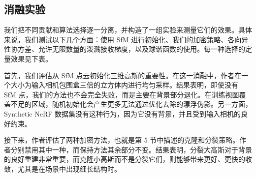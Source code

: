 \subsection{消融实验}

我们把不同贡献和算法选择逐一分离，并构造了一组实验来测量它们的效果。具体来说，我们测试以下几个方面：使用 SfM 进行初始化、我们的加密策略、各向异性协方差、允许无限数量的泼溅接收梯度，以及球谐函数的使用。每一种选择的定量效果见下表。

\begin{table}[H]
    \centering
    \caption{消融实验的 PSNR 分数。该实验中，作者将各场景的高分辨率输入图像手动下采样到与其他实验一致的渲染分辨率。}
    \scriptsize
\end{table}

首先，我们评估从 SfM 点云初始化三维高斯的重要性。在这一消融中，作者在一个大小为输入相机包围盒三倍的立方体内进行均匀采样。结果表明，即使没有 SfM 点，我们的方法也不会完全失败，而是主要在背景部分退化。在训练视图覆盖不足的区域，随机初始化会产生更多无法通过优化去除的漂浮伪影。另一方面，Synthetic NeRF 数据集没有这种行为，因为它没有背景，并且受到输入相机的良好约束。

接下来，作者评估了两种加密方法，也就是第 5 节中描述的克隆和分裂策略。作者分别禁用其中一种，而保持方法其余部分不变。结果表明，分裂大高斯对于背景的良好重建非常重要，而克隆小高斯而不是分裂它们，则能够带来更好、更快的收敛，尤其是在场景中出现细长结构时。

